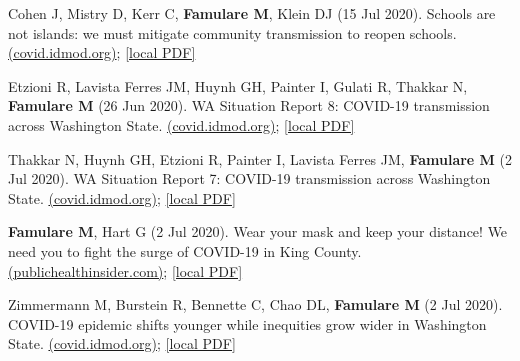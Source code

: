 \documentclass{article}
\begin{document}
\begin{llist}
\begin{items}
	
	\item[{[24]}] Cohen J, Mistry D, Kerr C, \textbf{Famulare M}, Klein DJ (15 Jul 2020). Schools are not islands: we must mitigate community transmission to reopen schools.  \href{https://iazpvnewgrp01.blob.core.windows.net/source/2021-02/reports/pdf/Schools_are_not_islands_we_must_mitigate_community_transmission_to_reopen_schools.pdf}{(covid.idmod.org)}; \href{https://famulare.github.io/assets/publication-mirror/Schools_are_not_islands_we_must_mitigate_community_transmission_to_reopen_schools.pdf}{[local PDF]}
	
	\item[{[23]}] Etzioni R, Lavista Ferres JM, Huynh GH, Painter I, Gulati R, Thakkar N, \textbf{Famulare M} (26 Jun 2020). WA Situation Report 8: COVID-19 transmission across Washington State. \href{https://iazpvnewgrp01.blob.core.windows.net/source/2021-02/reports/pdf/WA_Situation_Report_8_COVID-19_transmission_across_Washington_State.pdf}{(covid.idmod.org)}; \href{https://famulare.github.io/assets/publication-mirror/WA_Situation_Report_8_COVID-19_transmission_across_Washington_State.pdf}{[local PDF]}
	
	\item[{[22]}] Thakkar N, Huynh GH, Etzioni R, Painter I, Lavista Ferres JM, \textbf{Famulare M} (2 Jul 2020). WA Situation Report 7: COVID-19 transmission across Washington State. \href{https://iazpvnewgrp01.blob.core.windows.net/source/2021-02/reports/pdf/WA_Situation_Report_7_COVID-19_transmission_across_Washington_State.pdf}{(covid.idmod.org)}; \href{https://famulare.github.io/assets/publication-mirror/WA_Situation_Report_7_COVID-19_transmission_across_Washington_State.pdf}{[local PDF]}
	
	\item[{[21]}] \textbf{Famulare M}, Hart G (2 Jul 2020). Wear your mask and keep your distance! We need you to fight the surge of COVID-19 in King County. \href{https://publichealthinsider.com/2020/07/02/wear-your-mask-and-keep-your-distance-we-need-you-to-fight-the-surge-of-covid-19-in-king-county/}{(publichealthinsider.com)}; \href{https://famulare.github.io/assets/publication-mirror/Wear%20your%20mask%20and%20keep%20your%20distance!%20We%20need%20you%20to%20fight%20the%20surge%20of%20COVID-19%20in%20King%20County%20%E2%80%93%20PUBLIC%20HEALTH%20INSIDER.pdf}{[local PDF]}
	
	\item[{[20]}] Zimmermann M, Burstein R, Bennette C, Chao DL, \textbf{Famulare M} (2 Jul 2020). COVID-19 epidemic shifts younger while inequities grow wider in Washington State. \href{https://iazpvnewgrp01.blob.core.windows.net/source/2021-02/reports/pdf/Inequities_in_COVID-19_dynamics.pdf}{(covid.idmod.org)}; \href{https://famulare.github.io/assets/publication-mirror/Inequities_in_COVID-19_dynamics.pdf}{[local PDF]}
	

\end{items}
\end{llist}
\end{document}

